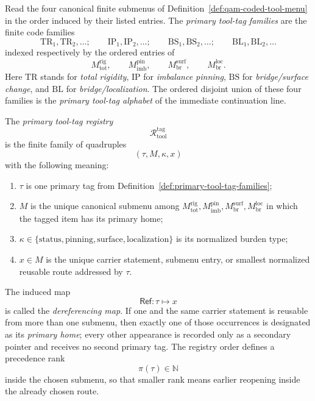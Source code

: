 \begin{definition}
\label{def:primary-tool-tag-families}
Read the four canonical finite submenus of Definition~\ref{def:qam-coded-tool-menu} in the order induced by their listed entries. The \emph{primary tool-tag families} are the finite code families
\[
\mathrm{TR}_1,\mathrm{TR}_2,\dots;\qquad
\mathrm{IP}_1,\mathrm{IP}_2,\dots;\qquad
\mathrm{BS}_1,\mathrm{BS}_2,\dots;\qquad
\mathrm{BL}_1,\mathrm{BL}_2,\dots
\]
indexed respectively by the ordered entries of
\[
M^{\mathrm{rig}}_{\mathrm{tot}},\qquad
M^{\mathrm{pin}}_{\mathrm{imb}},\qquad
M^{\mathrm{surf}}_{\mathrm{br}},\qquad
M^{\mathrm{loc}}_{\mathrm{br}}.
\]
Here \(\mathrm{TR}\) stands for \emph{total rigidity}, \(\mathrm{IP}\) for \emph{imbalance pinning}, \(\mathrm{BS}\) for \emph{bridge/surface change}, and \(\mathrm{BL}\) for \emph{bridge/localization}. The ordered disjoint union of these four families is the \emph{primary tool-tag alphabet} of the immediate continuation line.
\end{definition}

\begin{definition}
\label{def:primary-tool-tag-registry-dereferencing-map}
The \emph{primary tool-tag registry}
\[
\mathcal R^{\mathrm{tag}}_{\mathrm{tool}}
\]
is the finite family of quadruples
\[
(\tau,M,\kappa,x)
\]
with the following meaning:
\begin{enumerate}[leftmargin=2em]
 \item \(\tau\) is one primary tag from Definition~\ref{def:primary-tool-tag-families};
 \item \(M\) is the unique canonical submenu among \(M^{\mathrm{rig}}_{\mathrm{tot}}, M^{\mathrm{pin}}_{\mathrm{imb}}, M^{\mathrm{surf}}_{\mathrm{br}}, M^{\mathrm{loc}}_{\mathrm{br}}\) in which the tagged item has its primary home;
 \item \(\kappa\in\{\mathrm{status},\mathrm{pinning},\mathrm{surface},\mathrm{localization}\}\) is its normalized burden type;
 \item \(x\in M\) is the unique carrier statement, submenu entry, or smallest normalized reusable route addressed by \(\tau\).
\end{enumerate}
The induced map
\[
\mathsf{Ref}:\tau\longmapsto x
\]
is called the \emph{dereferencing map}. If one and the same carrier statement is reusable from more than one submenu, then exactly one of those occurrences is designated as its \emph{primary home}; every other appearance is recorded only as a secondary pointer and receives no second primary tag. The registry order defines a precedence rank
\[
\pi(\tau)\in\mathbb N
\]
inside the chosen submenu, so that smaller rank means earlier reopening inside the already chosen route.
\end{definition}

